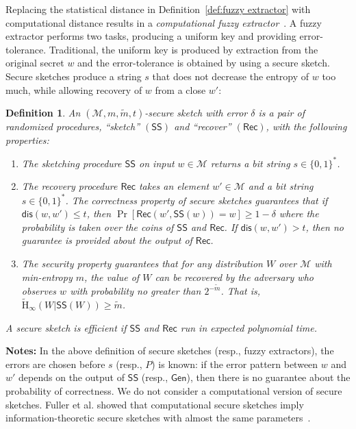 \documentclass[11pt]{article}
\newcommand{\defref}[1]{\mbox{Definition~\ref{#1}}}
\newcommand{\class}[1]{{\ensuremath{\mathsf{#1}}}}
\newcommand{\gen}{\ensuremath{\class{Gen}}\xspace}
\newcommand{\sketch}{\ensuremath{\class{SS}}\xspace}
\newcommand{\rec}{\ensuremath{\class{Rec}}\xspace}
\newcommand{\dis}{\ensuremath{\mathsf{dis}}}
\newcommand{\Hav}{\tilde{\mathrm{H}}_\infty}
\newtheorem{definition}[theorem]{Definition}
\begin{document}
Replacing the statistical distance in \defref{def:fuzzy extractor} with computational distance results in a \emph{computational fuzzy extractor}~\cite[Definition 2.5]{fuller2013computational}.  A fuzzy extractor performs two tasks, producing a uniform key and providing error-tolerance.  Traditional, the uniform key is produced by extraction from the original secret $w$ and the error-tolerance is obtained by using a secure sketch.  Secure sketches produce a string $s$ that does not decrease the entropy of $w$ too much, while allowing recovery of $w$ from a  close $w'$:
\begin{definition}
\label{def:secure sketch}
An $(\mathcal{M},m, \tilde{m}, t)$-\emph{secure sketch} with error $\delta$ is a pair of randomized procedures, ``sketch'' $(\sketch)$ and ``recover'' $(\rec)$, with the following properties:
\begin{enumerate}
\item The sketching procedure \sketch on input $w\in\mathcal{M}$ returns a bit string $s\in\{0,1\}^*$.
\item The recovery procedure \rec takes an element $w'\in\mathcal{M}$ and a bit string $s\in\{0,1\}^*$.  The \emph{correctness} property of secure sketches guarantees that if $\dis(w,w')\leq t$, then $\Pr[\rec(w',\sketch(w))=w]\geq 1-\delta$ where the probability is taken over the coins of $\sketch$ and $\rec$.  If $\dis(w,w')>t$, then no guarantee is provided about the output of \rec.
\item The \emph{security} property guarantees that for any distribution $W$ over $\mathcal{M}$ with min-entropy $m$, the value of $W$ can be recovered by the adversary who observes $w$ with probability no greater than $2^{-\tilde{m}}$.  That is, $\Hav(W|\sketch(W))\geq \tilde{m}$.
\end{enumerate}
A secure sketch is \emph{efficient} if \sketch and \rec run in expected polynomial time. 
\end{definition}

\textbf{Notes:} In the above definition of secure sketches (resp., fuzzy extractors), the errors are chosen before $s$ (resp., $P$) is known: if the error pattern between $w$ and $w'$ depends on the output of $\sketch$ (resp., $\gen$), then there is no guarantee about the probability of correctness.  We do not consider a computational version of secure sketches. Fuller et al. showed that computational secure sketches imply information-theoretic secure sketches with almost the same parameters~\cite[Corollary 3.8]{fuller2013computational}.
\end{document}

